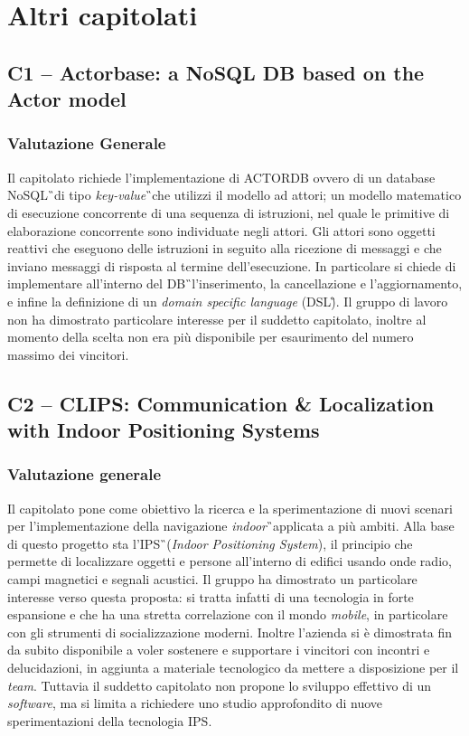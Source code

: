 \section{Altri capitolati}
\subsection {C1 – Actorbase: a NoSQL DB based on the Actor model}
\subsubsection{Valutazione Generale}
Il capitolato richiede l'implementazione di ACTORDB ovvero di un database 
NoSQL\G\ di tipo \textit{key-value}\G\ che utilizzi il modello ad attori; un 
modello matematico di esecuzione concorrente di una sequenza di istruzioni, nel 
quale le primitive di elaborazione concorrente sono individuate negli attori. 
Gli attori sono oggetti reattivi che eseguono delle istruzioni in seguito alla 
ricezione di messaggi e che inviano messaggi di risposta al termine 
dell'esecuzione. In particolare si chiede di implementare all'interno del DB\G\ 
l'inserimento, la cancellazione e l'aggiornamento, e infine la definizione di 
un \textit{domain specific language} (DSL\G). Il gruppo di lavoro non ha dimostrato particolare interesse per il suddetto capitolato, inoltre al momento della scelta non era più disponibile per esaurimento del numero massimo dei vincitori.

\subsection {C2 – CLIPS: Communication \& Localization with Indoor Positioning 
Systems}
\subsubsection{Valutazione generale}
Il capitolato pone come obiettivo la ricerca e la sperimentazione di nuovi scenari per l'implementazione della navigazione \textit{indoor}\G\ applicata a più ambiti. Alla base di questo progetto sta l'IPS\G\ (\textit{Indoor Positioning System}), il principio che permette di localizzare oggetti e persone all'interno di edifici usando onde radio, campi magnetici e segnali acustici. Il gruppo ha dimostrato un particolare interesse verso questa proposta: si tratta infatti di una tecnologia in forte espansione e che ha una stretta correlazione con il mondo \textit{mobile}, in particolare con gli strumenti di socializzazione moderni. Inoltre l'azienda si è dimostrata fin da subito disponibile a voler sostenere e supportare i vincitori con incontri e delucidazioni, in aggiunta a materiale tecnologico da mettere a disposizione per il \textit{team}. Tuttavia il suddetto capitolato non propone lo sviluppo effettivo di un \textit{software}, ma si limita a richiedere uno studio approfondito di nuove sperimentazioni della tecnologia IPS.

